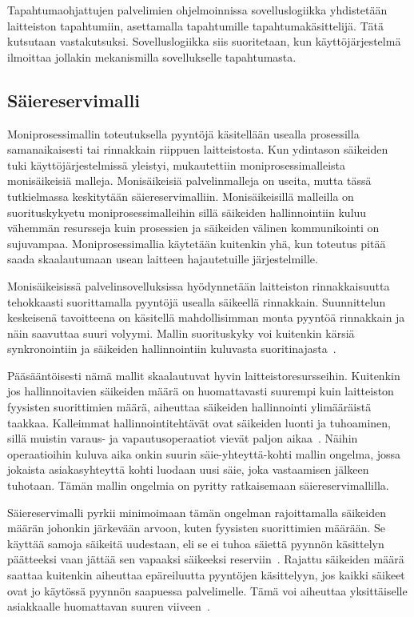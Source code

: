 \documentclass[finnish]{tktltiki2}
\theoremstyle{definition}
\theoremstyle{remark}
\begin{document}
Tapahtumaohjattujen palvelimien ohjelmoinnissa sovelluslogiikka yhdistetään
laitteiston tapahtumiin, asettamalla tapahtumille tapahtumakäsittelijä.
Tätä kutsutaan vastakutsuksi. Sovelluslogiikka siis suoritetaan, kun
käyttöjärjestelmä ilmoittaa jollakin mekanismilla sovellukselle tapahtumasta.


\subsection{Säiereservimalli}
Moniprosessimallin toteutuksella pyyntöjä käsitellään
usealla prosessilla samanaikaisesti tai rinnakkain riippuen laitteistosta.
Kun ydintason säikeiden tuki käyttöjärjestelmissä yleistyi, mukautettiin
moniprosessimalleista monisäikeisiä malleja.
Monisäikeisiä palvelinmalleja on useita, mutta tässä tutkielmassa keskitytään säiereservimalliin.
Monisäikeisillä malleilla on suorituskykyetu moniprosessimalleihin sillä säikeiden
hallinnointiin
kuluu vähemmän resursseja kuin prosessien ja säikeiden välinen kommunikointi on sujuvampaa.
Moniprosessimallia käytetään kuitenkin yhä, kun toteutus pitää
saada skaalautumaan usean laitteen hajautetuille järjestelmille.

Monisäikeisissä palvelinsovelluksissa hyödynnetään laitteiston
rinnakkaisuutta tehokkaasti suorittamalla pyyntöjä usealla säikeellä rinnakkain.
Suunnittelun keskeisenä tavoitteena on käsitellä mahdollisimman monta pyyntöä rinnakkain ja
näin saavuttaa suuri volyymi. Mallin suorituskyky voi kuitenkin
kärsiä synkronointiin ja säikeiden hallinnointiin kuluvasta
suoritinajasta~\cite{hu_applying_1998}.

Pääsääntöisesti nämä mallit skaalautuvat hyvin laitteistoresursseihin.
Kuitenkin jos hallinnoitavien säikeiden määrä on huomattavasti suurempi kuin laitteiston
fyysisten suorittimien määrä, aiheuttaa säikeiden hallinnointi ylimääräistä taakkaa.
Kalleimmat hallinnointitehtävät ovat säikeiden luonti ja tuhoaminen, sillä
muistin varaus- ja vapautusoperaatiot vievät paljon aikaa~\cite{ling_analysis_2000}.
Näihin operaatioihin kuluva aika onkin suurin säie-yhteyttä-kohti mallin
ongelma, jossa jokaista asiakasyhteyttä kohti
luodaan uusi säie, joka vastaamisen jälkeen tuhotaan.
Tämän mallin ongelmia on pyritty ratkaisemaan säiereservimallilla.

Säiereservimalli pyrkii minimoimaan tämän ongelman rajoittamalla
säikeiden määrän johonkin järkevään arvoon, kuten fyysisten suorittimien
määrään. Se käyttää samoja säikeitä uudestaan, eli se ei tuhoa säiettä
pyynnön käsittelyn päätteeksi vaan jättää sen vapaaksi säikeeksi reserviin~\cite{ling_analysis_2000}. Rajattu säikeiden määrä saattaa kuitenkin aiheuttaa epäreiluutta
pyyntöjen käsittelyyn, jos kaikki säikeet ovat jo käytössä pyynnön
saapuessa palvelimelle. Tämä voi aiheuttaa yksittäiselle asiakkaalle
huomattavan suuren viiveen~\cite{welsh_seda_2001}.
\end{document}
